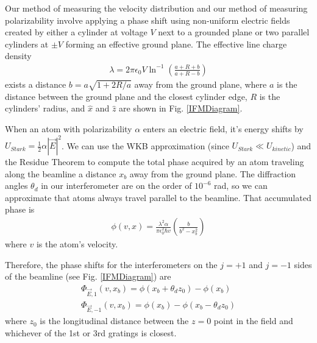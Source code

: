 \documentclass[twocolumn, prl,showpacs,superscriptaddress]{revtex4-1}   %
\newcommand{\abs}[1]{\left|#1\right|}
\newcommand{\figref}[1]{Fig. \ref{#1}}
\begin{document}
Our method of measuring the velocity distribution and our method of measuring polarizability involve applying a phase shift using non-uniform electric fields created by either a cylinder at voltage $V$ next to a grounded plane or two parallel cylinders at $\pm V$ forming an effective ground plane. The effective line charge density
\begin{align}
	\lambda = 2\pi\epsilon_0V\ln^{-1}
	\left(
		\frac{a+R+b}{a+R-b}
	\right)
	\label{lambda}
\end{align}
exists a distance $b = a\sqrt{1+2R/a}$ away from the ground plane, where $a$ is the distance between the ground plane and the closest cylinder edge, $R$ is the cylinders' radius, and $\hat{x}$ and $\hat{z}$ are shown in \figref{IFMDiagram}.

When an atom with polarizability $\alpha$ enters an electric field, it's energy shifts by $U_{Stark} = \frac{1}{2}\alpha\abs{\vec{E}}^2$. We can use the WKB approximation (since $U_{Stark} \ll U_{kinetic}$) and the Residue Theorem to compute the total phase acquired by an atom traveling along the beamline a distance $x_b$ away from the ground plane.
The diffraction angles $\theta_d$ in our interferometer are on the order of $10^{-6}$ rad, so we can approximate that atoms always travel parallel to the beamline. That accumulated phase is
\begin{align}
	\phi(v,x) = \frac{\lambda^2 \alpha}{\pi \epsilon_0^2 \hbar v}
	\left( \frac{b}{b^2-x_b^2} \right)
	\label{accumPhasePillars}
\end{align}
where $v$ is the atom's velocity.

Therefore, the phase shifts for the interferometers on the $j=+1$ and $j=-1$ sides of the beamline (see \figref{IFMDiagram}) are
\begin{align}
	\Phi_{\vec{E},1}(v,x_b) = \phi(x_b+\theta_d z_0) - \phi(x_b) \nonumber \\
	\Phi_{\vec{E},-1}(v,x_b) = \phi(x_b) - \phi(x_b-\theta_d z_0)
	\label{deltaPhasePillars}
\end{align}
where $z_0$ is the longitudinal distance between the $z=0$ point in the field and whichever of the 1st or 3rd gratings is closest.
\end{document}
